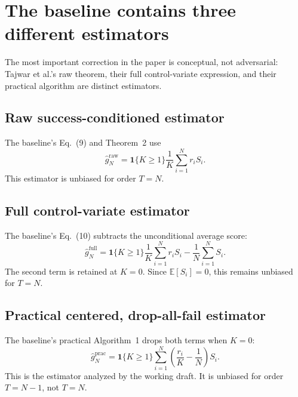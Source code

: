 \documentclass[11pt]{article}
\newcommand{\E}{\mathbb{E}}
\newcommand{\ind}{\mathbf{1}}
\theoremstyle{definition}
\theoremstyle{remark}
\begin{document}
\section{The baseline contains three different estimators}
\label{sec:three-estimators}

The most important correction in the paper is conceptual, not adversarial: Tajwar et al.'s raw theorem, their full control-variate expression, and their practical algorithm are distinct estimators.

\subsection{Raw success-conditioned estimator}

The baseline's Eq.~(9) and Theorem~2 use
\begin{equation}
\widehat g_N^{\mathrm{raw}}
=\ind\{K\ge1\}\frac{1}{K}\sum_{i=1}^{N}r_iS_i.
\label{eq:raw}
\end{equation}
This estimator is unbiased for order $T=N$.

\subsection{Full control-variate estimator}

The baseline's Eq.~(10) subtracts the unconditional average score:
\begin{equation}
\widehat g_N^{\mathrm{full}}
=\ind\{K\ge1\}\frac{1}{K}\sum_{i=1}^{N}r_iS_i
-\frac{1}{N}\sum_{i=1}^{N}S_i.
\label{eq:fullcv}
\end{equation}
The second term is retained at $K=0$. Since $\E[S_i]=0$, this remains unbiased for $T=N$.

\subsection{Practical centered, drop-all-fail estimator}

The baseline's practical Algorithm~1 drops both terms when $K=0$:
\begin{equation}
\widehat g_N^{\mathrm{prac}}
=\ind\{K\ge1\}\sum_{i=1}^{N}
\left(\frac{r_i}{K}-\frac{1}{N}\right)S_i.
\label{eq:practical}
\end{equation}
This is the estimator analyzed by the working draft. It is unbiased for order $T=N-1$, not $T=N$.
\end{document}
